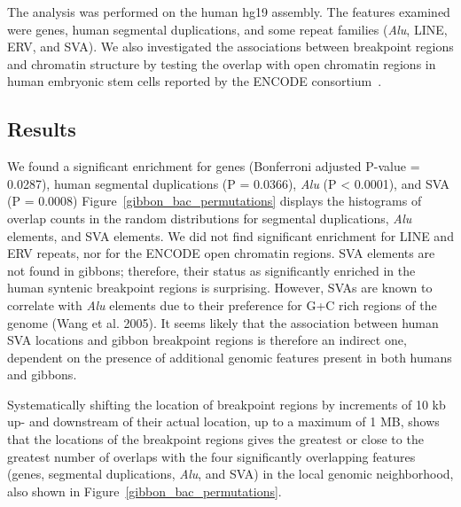 The analysis was performed on the human hg19 assembly. The features examined were genes, human segmental duplications, and some repeat families (\emph{Alu}, LINE, ERV, and SVA). We also investigated the associations between breakpoint regions and chromatin structure by testing the overlap with open chromatin regions in human embryonic stem cells reported by the ENCODE consortium~\cite{ENCODEProjectConsortium:2011iz}. 

\subsection{Results}

We found a significant enrichment for genes (Bonferroni adjusted P-value = 0.0287), human segmental duplications (P = 0.0366), \emph{Alu} (P < 0.0001), and SVA (P = 0.0008) Figure~\ref{gibbon_bac_permutations} displays the histograms of overlap counts in the random distributions for segmental duplications, \emph{Alu} elements, and SVA elements. We did not find significant enrichment for LINE and ERV repeats, nor for the ENCODE open chromatin regions. SVA elements are not found in gibbons; therefore, their status as significantly enriched in the human syntenic breakpoint regions is surprising. However, SVAs are known to correlate with \emph{Alu} elements due to their preference for G+C rich regions of the genome (Wang et al. 2005). It seems likely that the association between human SVA locations and gibbon breakpoint regions is therefore an indirect one, dependent on the presence of additional genomic features present in both humans and gibbons. 

Systematically shifting the location of breakpoint regions by increments of 10 kb up- and downstream of their actual location, up to a maximum of 1 MB, shows that the locations of the breakpoint regions gives the greatest or close to the greatest number of overlaps with the four significantly overlapping features (genes, segmental duplications, \emph{Alu}, and SVA) in the local genomic neighborhood, also shown in Figure~\ref{gibbon_bac_permutations}.

